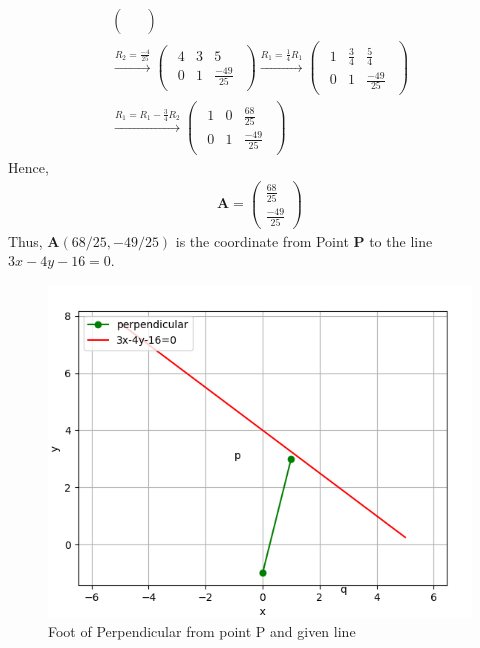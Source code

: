 \documentclass[12pt]{article}
\let\vec\mathbf
\newcommand{\myvec}[1]{\ensuremath{\begin{pmatrix}#1\end{pmatrix}}}
\let\vec\mathbf
\begin{document}
\begin{enumerate}
\begin{align}
\begin{pmatrix}
\begin{array}{rr|r}
  \end{array}
  \end{pmatrix}\\\xrightarrow[]{R_2=\frac{-4}{25}}
  \begin{pmatrix}
  \begin{array}{rr|r}
  4 & 3 & 5\\
  0 & 1 & \frac{-49}{25}
  \end{array}
  \end{pmatrix}\xrightarrow[]{R_1=\frac{1}{4}R_1}
  \begin{pmatrix}
  \begin{array}{rr|r}
  1 & \frac{3}{4} & \frac{5}{4}\\
  0 & 1 & \frac{-49}{25}
  \end{array}
  \end{pmatrix}\\\xrightarrow[]{R_1=R_1-\frac{3}{4}R_2}
  \begin{pmatrix}
  \begin{array}{rr|r}
  1 & 0 & \frac{68}{25}\\
  0 & 1 & \frac{-49}{25}  
  \end{array}
  \end{pmatrix}        
\end{align}
Hence,
\begin{align}
\vec{A}=\myvec{\frac{68}{25}\\\frac{-49}{25}}
\end{align}
Thus, $\vec{A}(68/25,-49/25)$ is the coordinate from Point $\vec{P}$ to the line $3x-4y-16=0$.
\begin{figure}[!h]
	\begin{center} 
	    \includegraphics[width=\columnwidth]{figs/lines.png}
	\end{center}
\caption{Foot of Perpendicular from point P and given line}
\label{fig:Fig}
\end{figure}
\end{enumerate}
\end{document}
